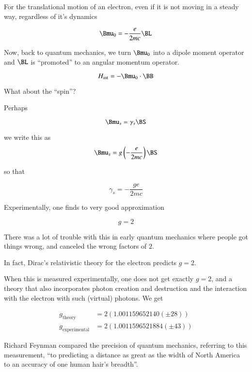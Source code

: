 For the translational motion of an electron, even if it is not moving in a steady way, regardless of it's dynamics

\begin{equation}\label{eqn:qmTwoL15:290}
\Bmu_0 = - \frac{e}{2 m c} \BL
\end{equation}

Now, back to quantum mechanics, we turn $\Bmu_0$ into a dipole moment operator and $\BL$ is ``promoted'' to an angular momentum operator.

\begin{equation}\label{eqn:qmTwoL15:310}
H_{\text{int}} = - \Bmu_0 \cdot \BB
\end{equation}

What about the ``spin''?

Perhaps 

\begin{equation}\label{eqn:qmTwoL15:330}
\Bmu_s = \gamma_s \BS
\end{equation}

we write this as 
\begin{equation}\label{eqn:qmTwoL15:350}
\Bmu_s = g \left( -\frac{e}{ 2 m c} \right)\BS
\end{equation}

so that

\begin{equation}\label{eqn:qmTwoL15:370}
\gamma_s = - \frac{g e}{ 2 m c} 
\end{equation}

Experimentally, one finds to very good approximation

\begin{equation}\label{eqn:qmTwoL15:390}
g = 2
\end{equation}

There was a lot of trouble with this in early quantum mechanics where people got things wrong, and canceled the wrong factors of $2$.

In fact, Dirac's relativistic theory for the electron predicts $g=2$.

When this is measured experimentally, one does not get exactly $g=2$, and a theory that also incorporates photon creation and destruction and the interaction with the electron with such (virtual) photons.  We get

\begin{equation}\label{eqn:qmTwoL15:410}
\begin{aligned}
g_{\text{theory}} 
&= 2 \left(
1.001159652140 (\pm 28)
\right) \\
g_{\text{experimental}} 
&= 2 \left(
1.0011596521884 (\pm 43)
\right)
\end{aligned}
\end{equation}

Richard Feynman compared the precision of quantum mechanics, referring to this measurement, ``to predicting a distance as great as the width of North America to an accuracy of one human hair's breadth''.

\EndArticle
